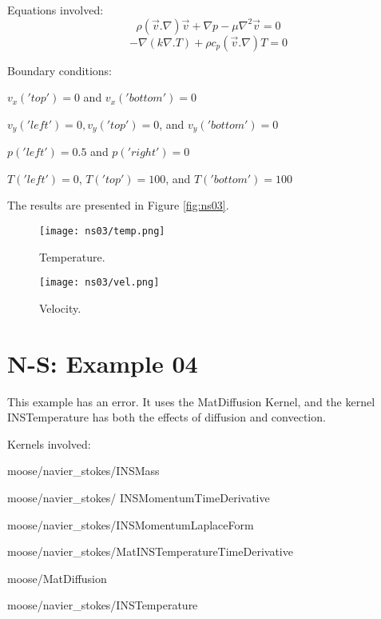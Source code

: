 \documentclass[11pt,letterpaper]{article}
\begin{document}
Equations involved:
\begin{equation}
\rho (\vec{v} . \nabla)\vec{v}+\nabla p - \mu \nabla^{2}\vec{v}=0
\end{equation}
\begin{equation}
-\nabla(k \nabla . T)+\rho c_{p}(\vec{v} . \nabla)T =0
\end{equation}

Boundary conditions:
\begin{description}[]
	\item[] $v_{x}('top')=0$ and $v_{x}('bottom')=0$
	\item[] $v_{y}('left')=0, v_{y}('top')=0$, and $v_{y}('bottom')=0$
	\item[] $p('left')=0.5$ and $p('right')=0$
	\item[] $T('left')=0$, $T('top')=100$, and $T('bottom')=100$
\end{description}

The results are presented in Figure \ref{fig:ns03}.
\begin{figure*}[!h]
	\centering
	\begin{subfigure}[t]{0.4\textwidth}
		\centering
		\texttt{[image: ns03/temp.png]} 
		\caption{Temperature.}
		\label{fig:ns03-temp}
	\end{subfigure}
	\vspace{1cm}
	\begin{subfigure}[t]{0.4\textwidth}
		\centering
		\texttt{[image: ns03/vel.png]}
		\caption{Velocity.}
		\label{fig:ns03-vel}
	\end{subfigure}
	\hfill
	\caption{Flux2.}
	\label{fig:ns03}
\end{figure*}

\section{N-S: Example 04}

This example has an error. It uses the MatDiffusion Kernel, and the kernel INSTemperature has both the effects of diffusion and convection.

Kernels involved:
\begin{description}[font=$\bullet$\scshape\bfseries]
	\item[] moose/navier\_stokes/INSMass
	\item[] moose/navier\_stokes/
	INSMomentumTimeDerivative
	\item[] moose/navier\_stokes/INSMomentumLaplaceForm
	\item[] moose/navier\_stokes/MatINSTemperatureTimeDerivative
	\item[] moose/MatDiffusion
	\item[] moose/navier\_stokes/INSTemperature
\end{description}
\end{document}
